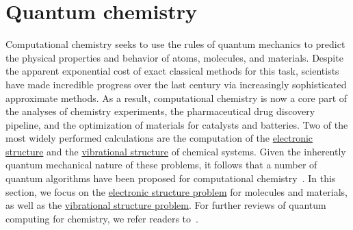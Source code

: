 


\section{Quantum chemistry }\label{appl:QuantumChemistry}

\begin{refsection}
Computational chemistry seeks to use the rules of quantum mechanics to predict the physical properties and behavior of atoms, molecules, and materials. Despite the apparent exponential cost of exact classical methods for this task, scientists have made incredible progress over the last century via increasingly sophisticated approximate methods. As a result, computational chemistry is now a core part of the analyses of chemistry experiments, the pharmaceutical drug discovery pipeline, and the optimization of materials for catalysts and batteries. Two of the most widely performed calculations are the computation of the \hyperref[appl:ElectronicStructure]{electronic structure} and the \hyperref[appl:VibrationalStructure]{vibrational structure} of chemical systems. Given the inherently quantum mechanical nature of these problems, it follows that a number of quantum algorithms have been proposed for computational chemistry~\cite{aspuru2005simulated}. In this section, we focus on the \hyperref[appl:ElectronicStructure]{electronic structure problem} for molecules and materials, as well as the \hyperref[appl:VibrationalStructure]{vibrational structure problem}. For further reviews of quantum computing for chemistry, we refer readers to~\cite{mcArdle2017QuantCompuChem, cao2019, bauer2020ChemicalReviews, motta2022QuantumChemistryReview}.




\localtableofcontents
\printbibliography[heading=secbib,segment=\therefsegment]
\end{refsection}



\newpage



